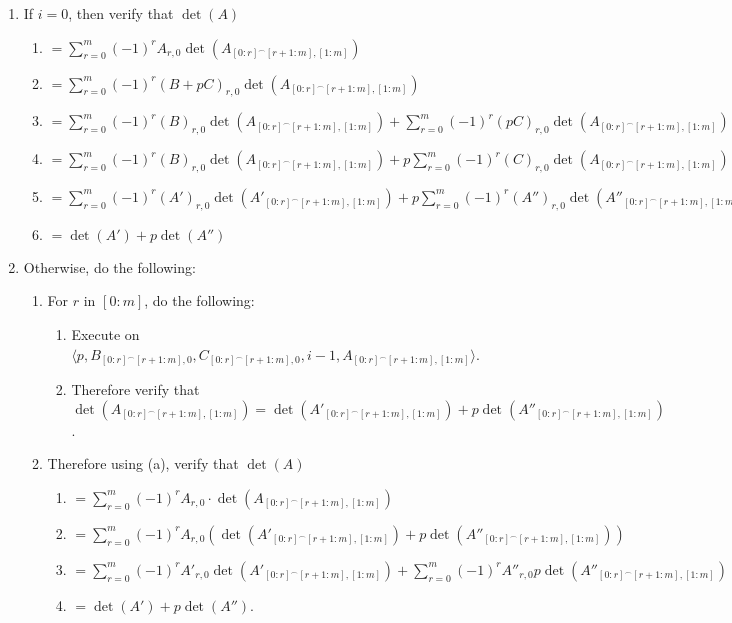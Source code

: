 \documentclass[twocolumn]{article}
\newcommand{\procedurehr}[2][]{\hyperref[sec:procedure #2]{\ifthenelse{\equal{#1}{}}{procedure #2}{#1}}}
\begin{document}
				\begin{enumerate}
					\item If $i=0$, then verify that $\det(A)$
					\begin{enumerate}
						\item $=\sum_{r=0}^m (-1)^{r}A_{r,0}\det(A_{[0:r]^\frown[r+1:m],[1:m]})$
						\item $=\sum_{r=0}^m (-1)^{r}(B+pC)_{r,0}\det(A_{[0:r]^\frown[r+1:m],[1:m]})$
						\item $=\sum_{r=0}^m (-1)^{r}(B)_{r,0}\det(A_{[0:r]^\frown[r+1:m],[1:m]})+\sum_{r=0}^m (-1)^{r}(pC)_{r,0}\det(A_{[0:r]^\frown[r+1:m],[1:m]})$
						\item $=\sum_{r=0}^m (-1)^{r}(B)_{r,0}\det(A_{[0:r]^\frown[r+1:m],[1:m]})+p\sum_{r=0}^m (-1)^{r}(C)_{r,0}\det(A_{[0:r]^\frown[r+1:m],[1:m]})$
						\item $=\sum_{r=0}^m (-1)^{r}(A')_{r,0}\det(A'_{[0:r]^\frown[r+1:m],[1:m]})+p\sum_{r=0}^m (-1)^{r}(A'')_{r,0}\det(A''_{[0:r]^\frown[r+1:m],[1:m]})$
						\item $=\det(A')+p\det(A'')$
					\end{enumerate}
					\item Otherwise, do the following:
					\begin{enumerate}
						\item For $r$ in $[0:m]$, do the following:
						\begin{enumerate}
							\item Execute \procedurehr{3.12} on $\langle p,B_{[0:r]^\frown[r+1:m],0},C_{[0:r]^\frown[r+1:m],0},i-1,A_{[0:r]^\frown[r+1:m],[1:m]}\rangle$.
							\item Therefore verify that $\det(A_{[0:r]^\frown[r+1:m],[1:m]})=\det(A'_{[0:r]^\frown[r+1:m],[1:m]})+p\det(A''_{[0:r]^\frown[r+1:m],[1:m]})$.
						\end{enumerate}
						\item Therefore using (a), verify that $\det(A)$
						\begin{enumerate}
							\item $=\sum_{r=0}^m (-1)^{r}A_{r,0}\cdot\det(A_{[0:r]^\frown[r+1:m],[1:m]})$
							\item $=\sum_{r=0}^m (-1)^{r}A_{r,0}(\det(A'_{[0:r]^\frown[r+1:m],[1:m]})+p\det(A''_{[0:r]^\frown[r+1:m],[1:m]}))$
							\item $=\sum_{r=0}^m (-1)^{r}A'_{r,0}\det(A'_{[0:r]^\frown[r+1:m],[1:m]})+\sum_{r=0}^m (-1)^{r}A''_{r,0}p\det(A''_{[0:r]^\frown[r+1:m],[1:m]})$
							\item $=\det(A')+p\det(A'')$.
						\end{enumerate}
					\end{enumerate}
				\end{enumerate}
\end{document}
